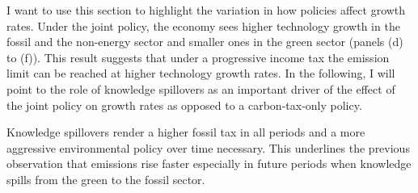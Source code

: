 I want to use this section to highlight the variation in how policies affect growth rates.
Under the joint policy, the economy sees higher technology growth in the fossil and the non-energy sector and smaller ones in the green sector (panels (d) to (f)). 
This result suggests that under a progressive income tax the emission limit can be reached at higher technology growth rates.
In the following, I will point to the role of knowledge spillovers as an important driver of the effect of the joint policy on growth rates as opposed to a carbon-tax-only policy. 

Knowledge spillovers render a higher fossil tax in all periods and a more aggressive environmental policy over time necessary.
This underlines the previous observation that emissions rise faster especially in future periods when knowledge spills from the green to the fossil sector. 


